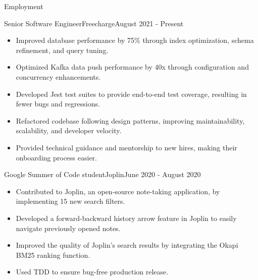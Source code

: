 \documentclass[]{mcdowellcv}
\begin{document}
	\makeheader
	
	\begin{cvsection}{Employment}
		\begin{cvsubsection}{Senior Software Engineer}{Freecharge}{August 2021 - Present}
			\begin{itemize}

   
        \item Improved database performance by 75\% through index optimization, schema refinement, and query tuning.

        \item Optimized Kafka data push performance by 40x through configuration and concurrency enhancements.
        

        \item  Developed Jest test suites to provide end-to-end test coverage, resulting in fewer bugs and regressions.
        
        

        \item Refactored codebase following design patterns, improving maintainability, scalability, and developer velocity.

        
        
        \item Provided technical guidance and mentorship to new hires, making their onboarding process easier.


			\end{itemize}
		\end{cvsubsection}
		
		\begin{cvsubsection}{Google Summer of Code student}{Joplin}{June 2020 - August 2020}	
			\begin{itemize}
				\item Contributed to Joplin, an open-source note-taking application, by implementing 15 new search filters.
                    \item Developed a forward-backward history arrow feature in Joplin to easily navigate previously opened notes.
				\item Improved the quality of Joplin's search results by integrating the Okapi BM25 ranking function.
                    \item  Used TDD to ensure bug-free production release.
			\end{itemize}
		\end{cvsubsection}
		

\end{cvsection}
\end{document}
